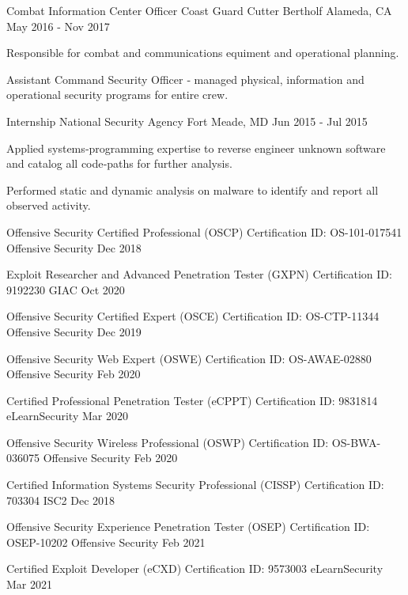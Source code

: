\documentclass[11pt, letterpaper]{awesome-cv}
\begin{document}
\begin{cventries}
  \cventry
    {Combat Information Center Officer}
    {Coast Guard Cutter Bertholf}
    {Alameda, CA}
    {May 2016 - Nov 2017}
    {
      \begin{cvitems}
        \item{Responsible for combat and communications equiment and operational planning.}
        \item{Assistant Command Security Officer ‑ managed physical, information and operational security programs for entire crew.}
      \end{cvitems}
    }


  \cventry
    {Internship}
    {National Security Agency}
    {Fort Meade, MD}
    {Jun 2015 - Jul 2015}
    {
      \begin{cvitems}
        \item{Applied systems‑programming expertise to reverse engineer unknown software and catalog all code‑paths for further analysis.}
        \item{Performed static and dynamic analysis on malware to identify and report all observed activity.}
      \end{cvitems}
    }



\end{cventries}

\begin{cvhonors}

  \cvhonor
    {Offensive Security Certified Professional (OSCP)}
    {Certification ID: OS-101-017541}
    {Offensive Security}
    {Dec 2018}

  \cvhonor
    {Exploit Researcher and Advanced Penetration Tester (GXPN)}
    {Certification ID: 9192230}
    {GIAC}
    {Oct 2020}

  \cvhonor
    {Offensive Security Certified Expert (OSCE)}
    {Certification ID: OS-CTP-11344}
    {Offensive Security}
    {Dec 2019}

  \cvhonor
    {Offensive Security Web Expert (OSWE)}
    {Certification ID: OS-AWAE-02880}
    {Offensive Security}
    {Feb 2020}

  \cvhonor
    {Certified Professional Penetration Tester (eCPPT)}
    {Certification ID: 9831814}
    {eLearnSecurity}
    {Mar 2020}

  \cvhonor
    {Offensive Security Wireless Professional (OSWP)}
    {Certification ID: OS-BWA-036075}
    {Offensive Security}
    {Feb 2020}

  \cvhonor
    {Certified Information Systems Security Professional (CISSP)}
    {Certification ID: 703304}
    {ISC2}
    {Dec 2018}

  \cvhonor
    {Offensive Security Experience Penetration Tester (OSEP)}
    {Certification ID: OSEP-10202}
    {Offensive Security}
    {Feb 2021}

  \cvhonor
    {Certified Exploit Developer (eCXD)}
    {Certification ID: 9573003}
    {eLearnSecurity}
    {Mar 2021}


\end{cvhonors}
\end{document}
